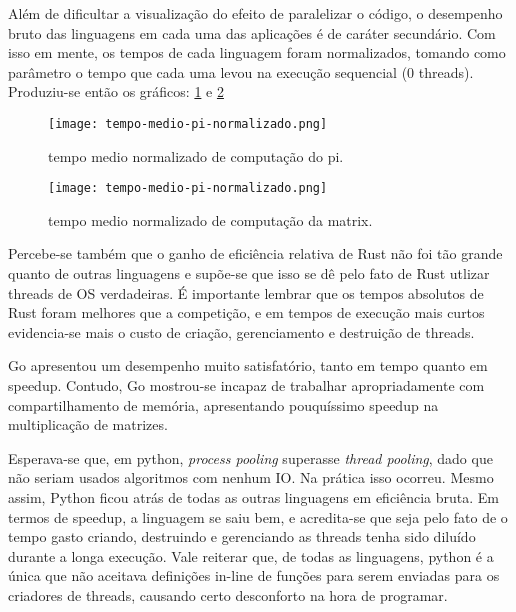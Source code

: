 \documentclass[12pt,a4paper]{article}
\begin{document}
Além de dificultar a visualização do efeito de paralelizar o código, o desempenho bruto das linguagens em cada uma das aplicações é de caráter secundário. Com isso em mente, os tempos de cada linguagem foram normalizados, tomando como parâmetro o tempo que cada uma levou na execução sequencial (0 threads). Produziu-se então os gráficos: \ref{fig:tempo medio norm pi} e \ref{fig:tempo medio norm matrix}

\begin{figure}[t] %
    \centering
    \texttt{[image: tempo-medio-pi-normalizado.png]}
    \caption{tempo medio normalizado de computação do pi.}
    \label{fig:tempo medio norm pi}
\end{figure}

\begin{figure}[t] %
    \centering
    \texttt{[image: tempo-medio-pi-normalizado.png]}
    \caption{tempo medio normalizado de computação da matrix.}
    \label{fig:tempo medio norm matrix}
\end{figure}

Percebe-se também que o ganho de eficiência relativa de Rust não foi tão grande quanto de outras linguagens e supõe-se que isso se dê pelo fato de Rust utlizar threads de OS verdadeiras. É importante lembrar que os tempos absolutos de Rust foram melhores que a competição, e em tempos de execução mais curtos evidencia-se mais o custo de criação, gerenciamento e destruição de threads.

Go apresentou um desempenho muito satisfatório, tanto em tempo quanto em speedup. Contudo, Go mostrou-se incapaz de trabalhar apropriadamente com compartilhamento de memória, apresentando pouquíssimo speedup na multiplicação de matrizes.


Esperava-se que, em python, \emph{process pooling} superasse \emph{thread pooling}, dado que não seriam usados algoritmos com nenhum IO. Na prática isso ocorreu. Mesmo assim, Python ficou atrás de todas as outras linguagens em eficiência bruta. Em termos de speedup, a linguagem se saiu bem, e acredita-se que seja pelo fato de o tempo gasto criando, destruindo e gerenciando as threads tenha sido diluído durante a longa execução. Vale reiterar que, de todas as linguagens, python é a única que não aceitava definições in-line de funções para serem enviadas para os criadores de threads, causando certo desconforto na hora de programar.
\end{document}
